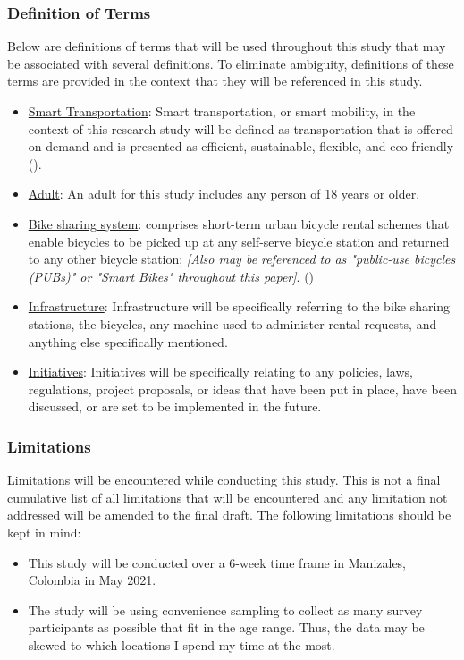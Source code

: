 \documentclass[12pt]{article}
\begin{document}
\subsubsection*{Definition of Terms}
Below are definitions of terms that will be used throughout this study that may be associated with several definitions. To eliminate ambiguity, definitions of these terms are provided in the context that they will be referenced in this study. 
\begin{itemize}
    \item \underline{Smart Transportation}: Smart transportation, or smart mobility, in the context of this research study will be defined as transportation that is offered on demand and is presented as efficient, sustainable, flexible, and eco-friendly (\cite{SmartTransportation}).
    \item \underline{Adult}: An adult for this study includes any person of 18 years or older.
    \item \underline{Bike sharing system}: comprises short-term urban bicycle rental schemes that enable bicycles to be picked up at any self-serve bicycle station and returned to any other bicycle station; \textit{[Also may be referenced to as "public-use bicycles (PUBs)" or "Smart Bikes" throughout this paper]}. (\cite{midgley_2011})
    \item \underline{Infrastructure}: Infrastructure will be specifically referring to the bike sharing stations, the bicycles, any machine used to administer rental requests, and anything else specifically mentioned. 
    \item \underline{Initiatives}: Initiatives will be specifically relating to any policies, laws, regulations, project proposals, or ideas that have been put in place, have been discussed, or are set to be implemented in the future.
\end{itemize}

\subsubsection*{Limitations}
Limitations will be encountered while conducting this study. This is not a final cumulative list of all limitations that will be encountered and any limitation not addressed will be amended to the final draft. The following limitations should be kept in mind: 
\begin{itemize}
    \item This study will be conducted over a 6-week time frame in Manizales, Colombia in May 2021. 
    \item The study will be using convenience sampling to collect as many survey participants as possible that fit in the age range. Thus, the data may be skewed to which locations I spend my time at the most. 
\end{itemize}
\end{document}
